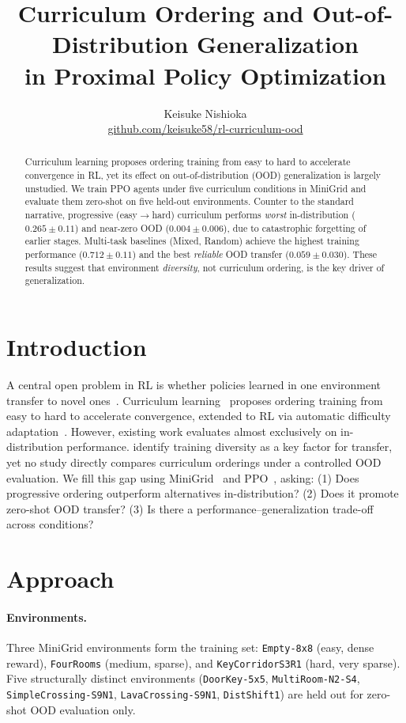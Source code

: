 \documentclass{article}
\title{Curriculum Ordering and Out-of-Distribution Generalization\\
in Proximal Policy Optimization}
\author{Keisuke Nishioka \\ \url{github.com/keisuke58/rl-curriculum-ood}}
\begin{document}
\maketitle

\begin{abstract}
Curriculum learning proposes ordering training from easy to hard to accelerate convergence in RL,
yet its effect on out-of-distribution (OOD) generalization is largely unstudied.
We train PPO agents under five curriculum conditions in MiniGrid and evaluate them zero-shot on five held-out environments.
Counter to the standard narrative, progressive (easy$\to$hard) curriculum performs \emph{worst} in-distribution
($0.265\pm0.11$) and near-zero OOD ($0.004\pm0.006$), due to catastrophic forgetting of earlier stages.
Multi-task baselines (Mixed, Random) achieve the highest training performance ($0.712\pm0.11$) and the best
\emph{reliable} OOD transfer ($0.059\pm0.030$).
These results suggest that environment \emph{diversity}, not curriculum ordering, is the key driver of generalization.
\end{abstract}

\section{Introduction}

A central open problem in RL is whether policies learned in one environment transfer to novel ones~\citep{kirk-jair23}.
Curriculum learning~\citep{bengio-icml09} proposes ordering training from easy to hard to accelerate convergence,
extended to RL via automatic difficulty adaptation~\citep{portelas-ijcai20}.
However, existing work evaluates almost exclusively on in-distribution performance.
\citet{kirk-jair23} identify training diversity as a key factor for transfer, yet no study directly compares
curriculum orderings under a controlled OOD evaluation.
We fill this gap using MiniGrid~\citep{chevalier-neurips23} and PPO~\citep{schulman-arxiv17}, asking:
(1) Does progressive ordering outperform alternatives in-distribution?
(2) Does it promote zero-shot OOD transfer?
(3) Is there a performance--generalization trade-off across conditions?

\section{Approach}

\paragraph{Environments.}
Three MiniGrid environments form the training set:
\texttt{Empty-8x8} (easy, dense reward),
\texttt{FourRooms} (medium, sparse), and
\texttt{KeyCorridorS3R1} (hard, very sparse).
Five structurally distinct environments (\texttt{DoorKey-5x5}, \texttt{MultiRoom-N2-S4},
\texttt{SimpleCrossing-S9N1}, \texttt{LavaCrossing-S9N1}, \texttt{DistShift1}) are held out for zero-shot OOD evaluation only.
\end{document}
